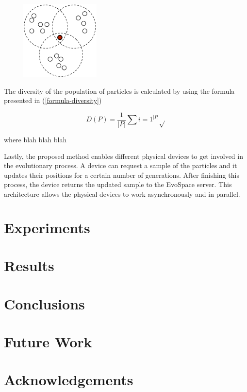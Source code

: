 \documentclass[runningheads,a4paper]{llncs}
\begin{document}
\begin{figure}
  \centering
  \includegraphics[height=4cm]{pdf/distributed-pso}
  \caption{}
  \label{distributed-pso}
\end{figure}

The diversity of the population of particles is calculated by using
the formula presented in (\ref{formula-diversity})

\begin{equation}
  \label{formula-diversity}
  D(P) = \frac{1}{|P|}\sum{i=1}^{|P|} \sqrt{}
\end{equation}

where blah blah blah %

Lastly, the proposed method enables different physical devices to get
involved in the evolutionary process. A device can request a sample of
the particles and it updates their positions for a certain number of
generations. After finishing this process, the device returns the
updated sample to the EvoSpace server. This architecture allows the
physical devices to work asynchronously and in parallel.

\section{Experiments}
\label{experiments}

\section{Results}
\label{results}

\section{Conclusions}
\label{conclusions}

\section{Future Work}
\label{future-work}

\section{Acknowledgements}
\end{document}

